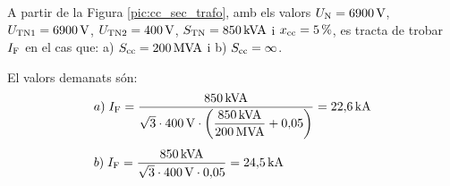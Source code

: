 \begin{exemple}
A partir de la Figura \vref{pic:cc_sec_trafo}, amb els valors
$U_\mathrm{N}=6900\mathrm{\,V}$, $U_\mathrm{TN1}=6900\mathrm{\,V}$,
$U_\mathrm{TN2}=400\mathrm{\,V}$, $S_\mathrm{TN}=850\mathrm{\,kVA}$ i
$x_\mathrm{cc}=5\mathrm{\,\%}$, es tracta de trobar $I_\mathrm{F}$ en el cas
que: a) $S_\mathrm{cc}=200\mathrm{\,MVA}$ i b) $S_\mathrm{cc}=\infty$.

El valors demanats s\'{o}n:
\begin{align*}
   &a)\;I_\mathrm{F} = \frac{850\mathrm{\,kVA}}{\sqrt{3}\cdot 400\mathrm{\,V}\cdot
   \left(\dfrac{850\mathrm{\,kVA}}{200\mathrm{\,MVA}} +
   0{,}05\right)} = 22{,}6\mathrm{\,kA} \\[1ex]
   &b)\;I_\mathrm{F} = \frac{850\mathrm{\,kVA}}{\sqrt{3}\cdot 400\mathrm{\,V}\cdot
   0{,}05} = 24{,}5\mathrm{\,kA}
\end{align*}

\end{exemple}
